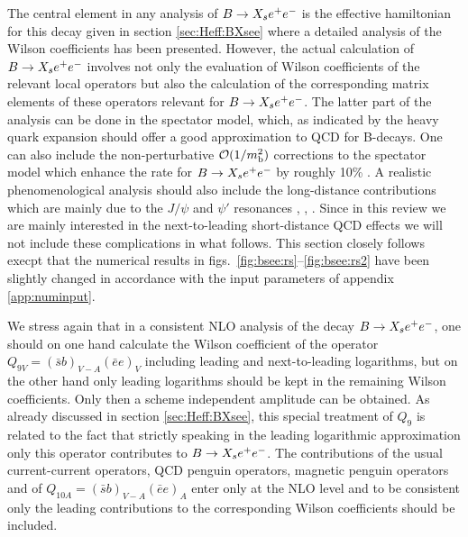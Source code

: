 The central element in any analysis of $B \to X_s e^+ e^-$ is the effective
hamiltonian for this decay given in section \ref{sec:Heff:BXsee} where a
detailed analysis of the Wilson coefficients has been presented.
However, the actual calculation of $B \to X_s e^+ e^-$ involves not only the
evaluation of Wilson coefficients of the relevant local operators but
also the calculation of the corresponding matrix elements of these
operators relevant for $B \to X_s e^+ e^-$. The latter part of the analysis can be
done in the spectator model, which, as indicated by the heavy quark
expansion should offer a good approximation to QCD for B-decays. One can
also include the non-perturbative ${\cal O}(1/m_{\rm b}^2)$ corrections to
the spectator model which enhance the rate for $B \to X_s e^+ e^-$ by roughly 10\%
\cite{falketal:94}. A realistic phenomenological analysis should also
include the long-distance contributions which are mainly due to the
$J/\psi$ and $\psi'$ resonances \cite{LMS:89}, \cite{DTP:89},
\cite{DT:91}. Since in this review we are mainly interested in the
next-to-leading short-distance QCD effects we will not include these
complications in what follows. This section closely follows
\cite{burasmuenz:95} execpt that the numerical results in figs.\
\ref{fig:bsee:rs}--\ref{fig:bsee:rs2} have been slightly changed in
accordance with the input parameters of appendix \ref{app:numinput}.

We stress again that in a consistent NLO analysis of the decay $B \to X_s e^+ e^-$,
one should on one hand calculate the Wilson coefficient of the operator
$Q_{9V} = (\bar s b)_{V-A} (\bar e e)_V$ including leading and
next-to-leading logarithms, but on the other hand only leading
logarithms should be kept in the remaining Wilson coefficients. Only
then a scheme independent amplitude can be obtained. As already
discussed in section \ref{sec:Heff:BXsee}, this special treatment of
$Q_9$ is related to the fact that strictly speaking in the leading
logarithmic approximation only this operator contributes to $B \to X_s e^+ e^-$.
The contributions of the usual current-current operators, QCD penguin
operators, magnetic penguin operators and of $Q_{10A} = (\bar s
b)_{V-A}(\bar e e)_A$ enter only at the NLO level and to be consistent
only the leading contributions to the corresponding Wilson coefficients
should be included.

